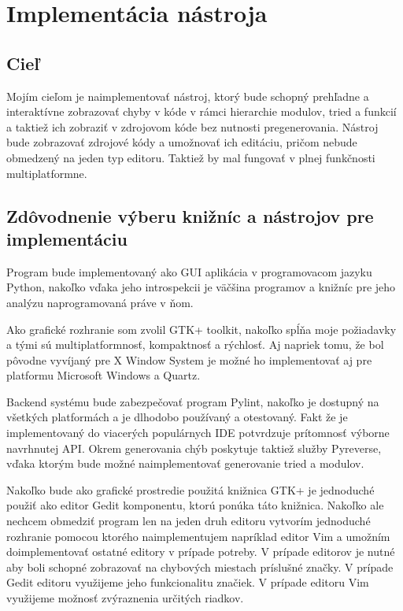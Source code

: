 \documentclass[11pt,oneside,final]{fithesis2}
\begin{document}
\chapter{Implementácia nástroja}
	\section{Cieľ}
	
	Mojím cieľom je naimplementovať nástroj, ktorý bude schopný prehľadne a interaktívne zobrazovať chyby v kóde v rámci hierarchie modulov, tried a funkcií a taktiež ich zobraziť v zdrojovom kóde bez nutnosti pregenerovania. Nástroj bude zobrazovať zdrojové kódy a umožnovať ich editáciu, pričom nebude obmedzený na jeden typ editoru. Taktiež by mal fungovať v plnej funkčnosti multiplatformne.
	
	\section{Zdôvodnenie výberu knižníc a nástrojov pre implementáciu}
		Program bude implementovaný ako GUI aplikácia v programovacom jazyku Python, nakoľko vďaka jeho introspekcii je väčšina programov a knižníc pre jeho analýzu naprogramovaná práve v ňom.
		
		Ako grafické rozhranie som zvolil GTK+ toolkit, nakoľko spĺňa moje požiadavky a tými sú multiplatformnosť, kompaktnosť a rýchlosť. Aj napriek tomu, že bol pôvodne vyvíjaný pre X Window System je možné ho implementovať aj pre platformu Microsoft Windows a Quartz.
		
		Backend systému bude zabezpečovať program Pylint, nakoľko je dostupný na všetkých platformách a je dlhodobo používaný a otestovaný. Fakt že je implementovaný do viacerých populárnych IDE potvrdzuje prítomnosť výborne navrhnutej API. Okrem generovania chýb poskytuje taktiež služby Pyreverse, vďaka ktorým bude možné naimplementovať generovanie tried a modulov.
		
		Nakoľko bude ako grafické prostredie použitá knižnica GTK+ je jednoduché použiť ako editor Gedit komponentu, ktorú ponúka táto knižnica. Nakoľko ale nechcem obmedziť program len na jeden druh editoru vytvorím jednoduché rozhranie pomocou ktorého naimplementujem napríklad editor Vim a umožním doimplementovať ostatné editory v prípade potreby. V prípade editorov je nutné aby boli schopné zobrazovať na chybových miestach príslušné značky. V prípade Gedit editoru využijeme jeho funkcionalitu značiek. V prípade editoru Vim využijeme možnosť zvýraznenia určitých riadkov.
		
\end{document}
